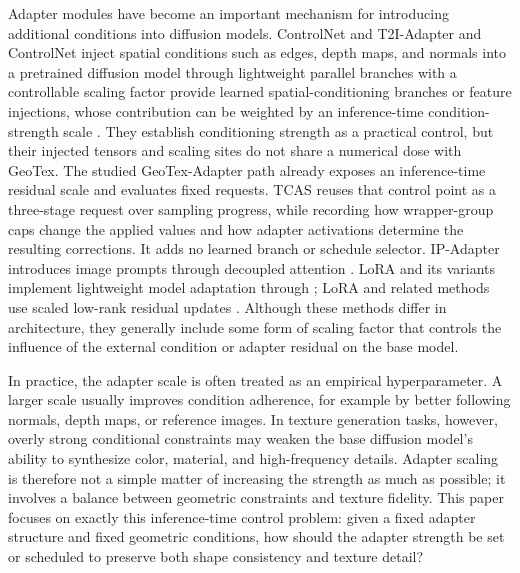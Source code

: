 \documentclass[times,twocolumn,final]{elsarticle}
\providecommand{\DIFadd}[1]{{\protect\color{blue} \sf #1}} %
\providecommand{\DIFdel}[1]{{\protect\color{red} \scriptsize #1}} %
\providecommand{\DIFaddbegin}{} %
\providecommand{\DIFaddend}{} %
\providecommand{\DIFdelbegin}{} %
\providecommand{\DIFdelend}{} %
\begin{document}
\DIFdelbegin \DIFdel{Adapter modules have become an important mechanism for introducing additional conditions into diffusion models. }\DIFdelend \DIFaddbegin \DIFadd{ControlNet and }\DIFaddend T2I-Adapter \DIFdelbegin \DIFdel{and ControlNet inject spatial conditions such as edges, depth maps, and normals into a pretrained diffusion model through lightweight parallel branches with a controllable scaling factor \cite{mou2023t2iadapter,zhang2023controlnet}}\DIFdelend \DIFaddbegin \DIFadd{provide learned spatial-conditioning branches or feature injections, whose contribution can be weighted by an inference-time condition-strength scale \cite{mou2023t2iadapter,zhang2023controlnet}. They establish conditioning strength as a practical control, but their injected tensors and scaling sites do not share a numerical dose with GeoTex. The studied GeoTex-Adapter path already exposes an inference-time residual scale and evaluates fixed requests. TCAS reuses that control point as a three-stage request over sampling progress, while recording how wrapper-group caps change the applied values and how adapter activations determine the resulting corrections. It adds no learned branch or schedule selector}\DIFaddend . IP-Adapter introduces image prompts through decoupled attention \cite{ye2023ipadapter}\DIFdelbegin \DIFdel{. LoRA and its variants implement lightweight model adaptation through }\DIFdelend \DIFaddbegin \DIFadd{; LoRA and related methods use scaled }\DIFaddend low-rank \DIFdelbegin \DIFdel{residual }\DIFdelend updates \cite{hu2022lora,liu2024dora,zhang2023adalora}.
\DIFdelbegin \DIFdel{Although these methods differ in architecture, they generally include some form of scaling factor that controls the influence of the external condition or adapter residual on the base model.
}%

\DIFdel{In practice, the adapter scale is often treated as an empirical hyperparameter. A larger scale usually improves condition adherence, for example by better following normals, depth maps, or reference images. In texture generation tasks, however, overly strong conditional constraints may weaken the base diffusion model's ability to synthesize color, material, and high-frequency details. Adapter scaling is therefore not a simple matter of increasing the strength as much as possible; it involves a balance between geometric constraints and texture fidelity. This paper focuses on exactly this inference-time control problem: given a fixed adapter structure and fixed geometric conditions, how should the adapter strength be set or scheduled to preserve both shape consistency and texture detail?
}\DIFdelend
\end{document}
